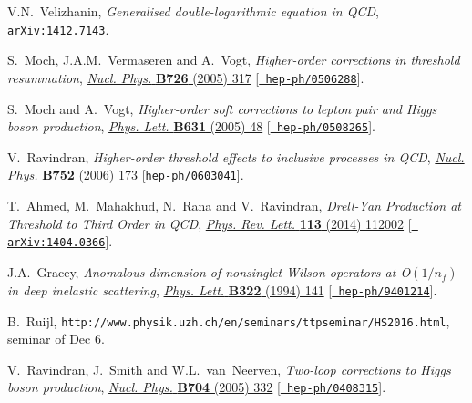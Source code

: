 \documentclass[12pt]{article}
\def\nf{{n^{}_{\! f}}}
\begin{document}
{\begin{thebibliography}{100}
V.N.~Velizhanin, \emph{{Generalised double-logarithmic equation in QCD}},
  \href{https://arxiv.org/abs/1412.7143}{{\tt arXiv:1412.7143}}.

S.~Moch, J.A.M.~Vermaseren and A.~Vogt, \emph{{Higher-order corrections in
  threshold resummation}},
  \href{https://dx.doi.org/10.1016/j.nuclphysb.2005.08.005}{\emph{Nucl. Phys.}
  {\bf B726} (2005) 317} [\href{https://arxiv.org/abs/hep-ph/0506288}{{\tt
  hep-ph/0506288}}].

S.~Moch and A.~Vogt, \emph{{Higher-order soft corrections to lepton pair and
  Higgs boson production}},
  \href{https://dx.doi.org/10.1016/j.physletb.2005.09.061}{\emph{Phys. Lett.}
  {\bf B631} (2005) 48} [\href{https://arxiv.org/abs/hep-ph/0508265}{{\tt
  hep-ph/0508265}}].

V.~Ravindran, \emph{{Higher-order threshold effects to inclusive processes in
  QCD}}, \href{https://dx.doi.org/10.1016/j.nuclphysb.2006.06.025}{\emph{Nucl.
  Phys.} {\bf B752} (2006) 173}
  [\href{https://arxiv.org/abs/hep-ph/0603041}{{\tt hep-ph/0603041}}].

T.~Ahmed, M.~Mahakhud, N.~Rana and V.~Ravindran, \emph{{Drell-Yan Production at
  Threshold to Third Order in QCD}},
  \href{https://dx.doi.org/10.1103/PhysRevLett.113.112002}{\emph{Phys. Rev.
  Lett.} {\bf 113} (2014) 112002} [\href{https://arxiv.org/abs/1404.0366}{{\tt
  arXiv:1404.0366}}].

J.A.~Gracey, \emph{{Anomalous dimension of nonsinglet Wilson operators at
  O$(1/\nf)$ in deep inelastic scattering}},
  \href{https://dx.doi.org/10.1016/0370-2693(94)90502-9}{\emph{Phys. Lett.}
  {\bf B322} (1994) 141} [\href{https://arxiv.org/abs/hep-ph/9401214}{{\tt
  hep-ph/9401214}}].

B.~Ruijl, {\tt http://www.physik.uzh.ch/en/seminars/ttpseminar/HS2016.html}, 
 seminar of Dec 6.

V.~Ravindran, J.~Smith and W.L.~van~Neerven, \emph{{Two-loop corrections to
  Higgs boson production}},
  \href{https://dx.doi.org/10.1016/j.nuclphysb.2004.10.039}{\emph{Nucl. Phys.}
  {\bf B704} (2005) 332} [\href{https://arxiv.org/abs/hep-ph/0408315}{{\tt
  hep-ph/0408315}}].


\end{thebibliography}}
\end{document}
